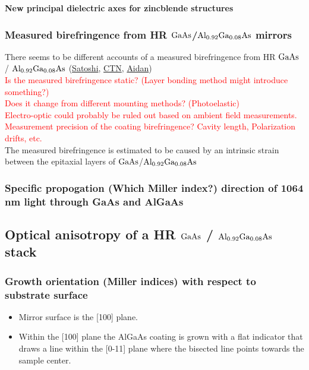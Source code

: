 \noindent \textbf{New principal dielectric axes for zincblende structures}

\subsubsection{Measured birefringence from HR $\mathrm{GaAs}$/$\mathrm{Al_{0.92}Ga_{0.08}As}$ mirrors}
There seems to be different accounts of a measured birefringence from HR $\mathrm{GaAs}$ / $\mathrm{Al_{0.92}Ga_{0.08}As}$ (\href{https://dcc.ligo.org/DocDB/0181/G2200386/001/G2200386.pdf}{Satoshi}, \href{https://nodus.ligo.caltech.edu:8081/CTN/1474}{CTN}, \href{https://dcc.ligo.org/DocDB/0181/G2200559/001/G2200559-v1%20-%20polarization.pdf}{Aidan})
\\
\textcolor{red}{Is the measured birefringence static? (Layer bonding method might introduce something?)}
\\
\textcolor{red}{Does it change from different mounting methods? (Photoelastic)}
\\
\textcolor{red}{Electro-optic could probably be ruled out based on ambient field measurements.}
\\
\textcolor{red}{Measurement precision of the coating birefringence? Cavity length, Polarization drifts, etc.}
\\
The measured birefringence is estimated to be caused by an intrinsic strain between the epitaxial layers of $\mathrm{GaAs}$/$\mathrm{Al_{0.92}Ga_{0.08}As}$

\subsubsection{Specific propogation (Which Miller index?) direction of 1064 nm light through GaAs and AlGaAs}


\subsection{Optical anisotropy of a HR $\mathrm{GaAs}$ / $\mathrm{Al_{0.92}Ga_{0.08}As}$ stack}


\subsubsection{Growth orientation (Miller indices) with respect to substrate surface}
\begin{itemize}
\item Mirror surface is the [100] plane.
\item Within the [100] plane the AlGaAs coating is grown with a flat indicator that draws a line within the [0-11] plane where the bisected line points towards the sample center.
\end{itemize}


